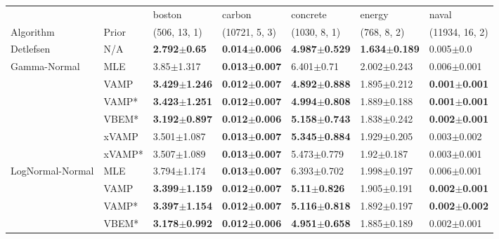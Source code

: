 \begin{tabular}{lllllll}
\toprule
                 &        &                    boston &                    carbon &                  concrete &                    energy &                     naval \\
Algorithm & Prior& (506, 13, 1)& (10721, 5, 3)& (1030, 8, 1)& (768, 8, 2)& (11934, 16, 2)\\
\midrule
Detlefsen & N/A &   \textbf{2.792$\pm$0.65} &  \textbf{0.014$\pm$0.006} &  \textbf{4.987$\pm$0.529} &  \textbf{1.634$\pm$0.189} &             0.005$\pm$0.0 \\
Gamma-Normal & MLE &            3.85$\pm$1.317 &  \textbf{0.013$\pm$0.007} &            6.401$\pm$0.71 &           2.002$\pm$0.243 &           0.006$\pm$0.001 \\
                 & VAMP &  \textbf{3.429$\pm$1.246} &  \textbf{0.012$\pm$0.007} &  \textbf{4.892$\pm$0.888} &           1.895$\pm$0.212 &  \textbf{0.001$\pm$0.001} \\
                 & VAMP* &  \textbf{3.423$\pm$1.251} &  \textbf{0.012$\pm$0.007} &  \textbf{4.994$\pm$0.808} &           1.889$\pm$0.188 &  \textbf{0.001$\pm$0.001} \\
                 & VBEM* &  \textbf{3.192$\pm$0.897} &  \textbf{0.012$\pm$0.006} &  \textbf{5.158$\pm$0.743} &           1.838$\pm$0.242 &  \textbf{0.002$\pm$0.001} \\
                 & xVAMP &           3.501$\pm$1.087 &  \textbf{0.013$\pm$0.007} &  \textbf{5.345$\pm$0.884} &           1.929$\pm$0.205 &           0.003$\pm$0.002 \\
                 & xVAMP* &           3.507$\pm$1.089 &  \textbf{0.013$\pm$0.007} &           5.473$\pm$0.779 &            1.92$\pm$0.187 &           0.003$\pm$0.001 \\
LogNormal-Normal & MLE &           3.794$\pm$1.174 &  \textbf{0.013$\pm$0.007} &           6.393$\pm$0.702 &           1.998$\pm$0.197 &           0.006$\pm$0.001 \\
                 & VAMP &  \textbf{3.399$\pm$1.159} &  \textbf{0.012$\pm$0.007} &   \textbf{5.11$\pm$0.826} &           1.905$\pm$0.191 &  \textbf{0.002$\pm$0.001} \\
                 & VAMP* &  \textbf{3.397$\pm$1.154} &  \textbf{0.012$\pm$0.007} &  \textbf{5.116$\pm$0.818} &           1.892$\pm$0.197 &  \textbf{0.002$\pm$0.002} \\
                 & VBEM* &  \textbf{3.178$\pm$0.992} &  \textbf{0.012$\pm$0.006} &  \textbf{4.951$\pm$0.658} &           1.885$\pm$0.189 &           0.002$\pm$0.001 \\

\end{tabular}
